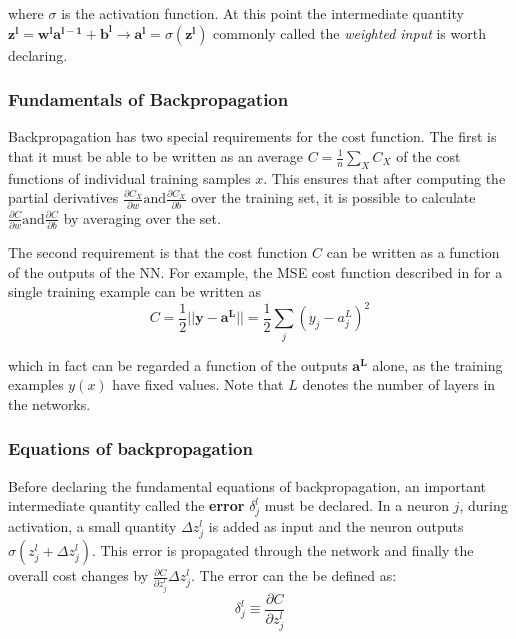 where $\sigma$ is the activation function. At this point the
intermediate quantity $\bm{z^l} = \bm{w^la^{l-1}} + \bm{b^l}
\rightarrow \bm{a^l} = \sigma(\bm{z^l})$ commonly called the
\textit{weighted input} is worth declaring.

\subsubsection*{Fundamentals of Backpropagation}

Backpropagation has two special requirements for the
cost function. The first is that it must be able to be
written as an average $C = \frac{1}{n} \sum_XC_X$ of the
cost functions of individual training samples $x$. This
ensures that after computing the partial derivatives
$\frac{\partial C_X}{\partial w} \text{and} \frac{\partial C_X}{\partial b}$
over the training set, it is possible to calculate 
$\frac{\partial C}{\partial w} \text{and} \frac{\partial C}{\partial b}$
by averaging over the set.

The second requirement is that the cost function $C$ can be
written as a function of the outputs of the NN. For example,
the MSE cost function described in 
for a single training example can be written as
\begin{equation}
  \label{eq:backprop_mse}
  C = \frac{1}{2}||\bm{y} - \bm{a^L}|| = \frac{1}{2}\sum_j(y_j - a^L_j)^2
\end{equation}

which in fact can be regarded a function of the outputs $\bm{a^L}$ alone,
as the training examples $y(x)$ have fixed values. Note that $L$ denotes the
number of layers in the networks.

\subsubsection*{Equations of backpropagation}

Before declaring the fundamental equations of backpropagation,
an important intermediate quantity called the \textbf{error} $\delta_j^l$
must be declared. In a neuron $j$, during activation, a small quantity $\Delta z_j^l$
is added as input and the neuron outputs $\sigma (z^l_j + \Delta z_j^l)$.
This error is propagated through the network and finally
the overall cost changes by $\frac{\partial C}{\partial z_j^l}\Delta z_j^l$.
The error can the be defined as:
\begin{equation}
  \label{eq:error_nn}
  \delta_j^l \equiv \frac{\partial C}{\partial z_j^l}
\end{equation}


